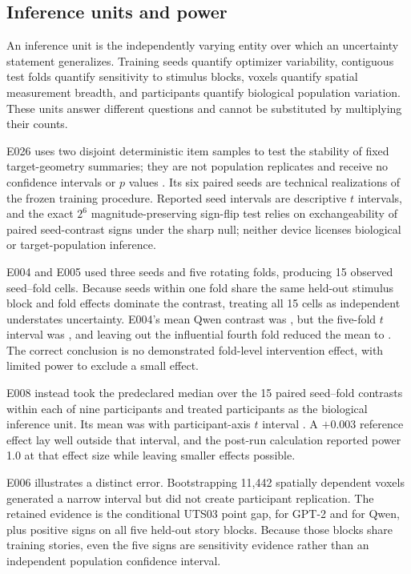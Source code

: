 \subsection{Inference units and power}
\label{sec:inference-detail}

An inference unit is the independently varying entity over which an uncertainty statement generalizes.
Training seeds quantify optimizer variability, contiguous test folds quantify sensitivity to stimulus blocks, voxels quantify spatial measurement breadth, and participants quantify biological population variation.
These units answer different questions and cannot be substituted by multiplying their counts.

E026 uses two disjoint deterministic item samples to test the stability of fixed target-geometry summaries; they are not population replicates and receive no confidence intervals or $p$ values .
Its six paired seeds are technical realizations of the frozen training procedure.
Reported seed intervals are descriptive $t$ intervals, and the exact $2^6$ magnitude-preserving sign-flip test relies on exchangeability of paired seed-contrast signs under the sharp null; neither device licenses biological or target-population inference.

E004 and E005 used three seeds and five rotating folds, producing 15 observed seed--fold cells.
Because seeds within one fold share the same held-out stimulus block and fold effects dominate the contrast, treating all 15 cells as independent understates uncertainty.
E004's mean Qwen contrast was , but the five-fold $t$ interval was , and leaving out the influential fourth fold reduced the mean to . 
The correct conclusion is no demonstrated fold-level intervention effect, with limited power to exclude a small effect.

E008 instead took the predeclared median over the 15 paired seed--fold contrasts within each of nine participants and treated participants as the biological inference unit.
Its mean was  with participant-axis $t$ interval . 
A $+0.003$ reference effect lay well outside that interval, and the post-run calculation reported power 1.0 at that effect size while leaving smaller effects possible. 

E006 illustrates a distinct error.
Bootstrapping 11,442 spatially dependent voxels generated a narrow interval but did not create participant replication.
The retained evidence is the conditional UTS03 point gap,  for GPT-2 and  for Qwen, plus positive signs on all five held-out story blocks. 
Because those blocks share training stories, even the five signs are sensitivity evidence rather than an independent population confidence interval.


